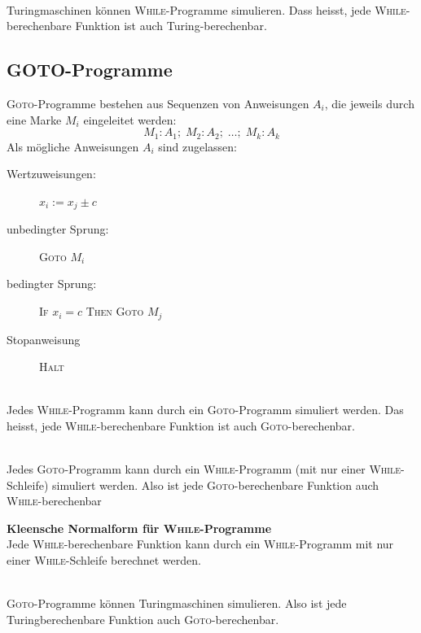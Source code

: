 \documentclass{scrartcl}
\begin{document}
\begin{shaded}
    \ \\Turingmaschinen können \textsc{While}-Programme simulieren. Dass heisst, jede \textsc{While}-berechenbare Funktion ist auch Turing-berechenbar.
\end{shaded}

\subsection*{GOTO-Programme}
\textsc{Goto}-Programme bestehen aus Sequenzen von Anweisungen $A_i$, die jeweils durch eine Marke $M_i$ eingeleitet werden: \[ M_1:A_1;\;M_2:A_2;\;\dots;\;M_k:A_k \] Als mögliche Anweisungen $A_i$ sind zugelassen:
\begin{description}
    \item[Wertzuweisungen:]  $x_i:=x_j\pm c$
    \item[unbedingter Sprung:] \textsc{Goto} $M_i$
    \item[bedingter Sprung:] \textsc{If} $x_i=c$ \textsc{Then Goto} $M_j$
    \item[Stopanweisung] \textsc{Halt}
\end{description}

\begin{shaded}
    \ \\Jedes \textsc{While}-Programm kann durch ein \textsc{Goto}-Programm simuliert werden. Das heisst, jede \textsc{While}-berechenbare Funktion ist auch \textsc{Goto}-berechenbar.
\end{shaded}

\begin{shaded}
    \ \\Jedes \textsc{Goto}-Programm kann durch ein \textsc{While}-Programm (mit nur einer \textsc{While}-Schleife) simuliert werden. Also ist jede \textsc{Goto}-berechenbare Funktion auch \textsc{While}-berechenbar
\end{shaded}

\begin{shaded}
    \textbf{Kleensche Normalform für \textsc{While}-Programme} \\
    Jede \textsc{While}-berechenbare Funktion kann durch ein \textsc{While}-Programm mit nur einer \textsc{While}-Schleife berechnet werden.
\end{shaded}

\begin{shaded}
    \ \\\textsc{Goto}-Programme können Turingmaschinen simulieren. Also ist jede Turingberechenbare Funktion auch \textsc{Goto}-berechenbar.
\end{shaded}
\begin{center}

\end{center}
\end{document}
